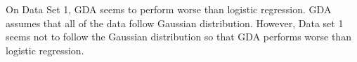 \begin{answer}
\begin{figure}[t] 

\centering


\centering

 


\label{fig:long}

\label{fig:onecol}

\end{figure}

On Data Set 1, GDA seems to perform worse than logistic regression. GDA assumes that all of the data follow Gaussian distribution. However, Data set 1 seems not to follow the Gaussian distribution so that GDA performs worse than logistic regression.

\end{answer}
